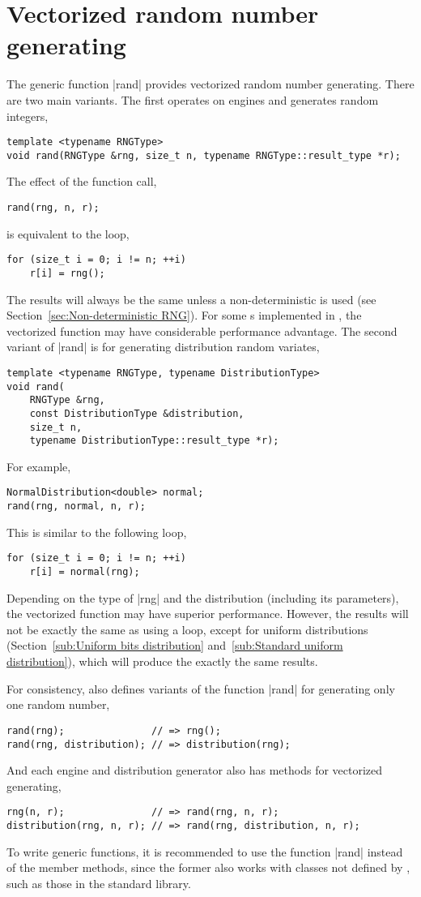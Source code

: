 \section{Vectorized random number generating}
\label{sec:Vectorized random number generating}

The generic function |rand| provides vectorized random number generating. There
are two main variants. The first operates on \rng engines and generates random
integers,
\begin{Verbatim}
template <typename RNGType>
void rand(RNGType &rng, size_t n, typename RNGType::result_type *r);
\end{Verbatim}
The effect of the function call,
\begin{Verbatim}
rand(rng, n, r);
\end{Verbatim}
is equivalent to the loop,
\begin{Verbatim}
for (size_t i = 0; i != n; ++i)
    r[i] = rng();
\end{Verbatim}
The results will always be the same unless a non-deterministic \rng is used
(see Section~\ref{sec:Non-deterministic RNG}). For some \rng{}s implemented in
\mckl, the vectorized function may have considerable performance advantage. The
second variant of |rand| is for generating distribution random variates,
\begin{Verbatim}
template <typename RNGType, typename DistributionType>
void rand(
    RNGType &rng,
    const DistributionType &distribution,
    size_t n,
    typename DistributionType::result_type *r);
\end{Verbatim}
For example,
\begin{Verbatim}
NormalDistribution<double> normal;
rand(rng, normal, n, r);
\end{Verbatim}
This is similar to the following loop,
\begin{Verbatim}
for (size_t i = 0; i != n; ++i)
    r[i] = normal(rng);
\end{Verbatim}
Depending on the type of |rng| and the distribution (including its parameters),
the vectorized function may have superior performance. However, the results
will not be exactly the same as using a loop, except for uniform distributions
(Section~\ref{sub:Uniform bits distribution} and~\ref{sub:Standard uniform
distribution}), which will produce the exactly the same results.

For consistency, \mckl also defines variants of the function |rand| for
generating only one random number,
\begin{Verbatim}
rand(rng);               // => rng();
rand(rng, distribution); // => distribution(rng);
\end{Verbatim}
And each \rng engine and distribution generator also has methods for vectorized
generating,
\begin{Verbatim}
rng(n, r);               // => rand(rng, n, r);
distribution(rng, n, r); // => rand(rng, distribution, n, r);
\end{Verbatim}
To write generic functions, it is recommended to use the function |rand|
instead of the member methods, since the former also works with classes not
defined by \mckl, such as those in the standard library.

